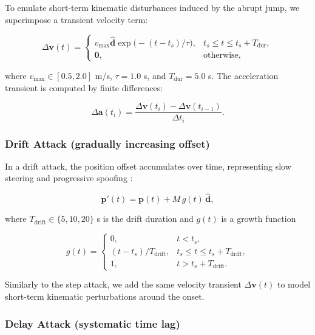 \documentclass{ieeeaccess}
\begin{document}
To emulate short-term kinematic disturbances induced by the abrupt jump, we superimpose a transient velocity term:

\begin{equation}
\Delta\mathbf{v}(t)=
\begin{cases}
 v_{\max}\hat{\mathbf{d}}\exp\bigl(-(t-t_s)/\tau\bigr), & t_s\le t\le t_s+T_{\mathrm{dur}},\\
 \mathbf{0}, & \text{otherwise},
\end{cases}
\end{equation}

where $v_{\max}\in[0.5,2.0]$ m/s, $\tau=1.0$ s, and $T_{\mathrm{dur}}=5.0$ s. The acceleration transient is computed by finite differences:

\begin{equation}
\Delta\mathbf{a}(t_i)=\frac{\Delta\mathbf{v}(t_i)-\Delta\mathbf{v}(t_{i-1})}{\Delta t_i}.
\end{equation}

\subsubsection{Drift Attack (gradually increasing offset)}

In a drift attack, the position offset accumulates over time, representing slow steering and progressive spoofing \cite{ref16}:

\begin{equation}
\mathbf{p}'(t)=\mathbf{p}(t)+M\,g(t)\,\hat{\mathbf{d}},
\end{equation}

where $T_{\mathrm{drift}}\in\{5,10,20\}$ s is the drift duration and $g(t)$ is a growth function

\begin{equation}
g(t)=
\begin{cases}
0, & t<t_s,\\
(t-t_s)/T_{\mathrm{drift}}, & t_s\le t\le t_s+T_{\mathrm{drift}},\\
1, & t>t_s+T_{\mathrm{drift}}.
\end{cases}
\end{equation}

Similarly to the step attack, we add the same velocity transient $\Delta\mathbf{v}(t)$ to model short-term kinematic perturbations around the onset.

\subsubsection{Delay Attack (systematic time lag)}
\end{document}
